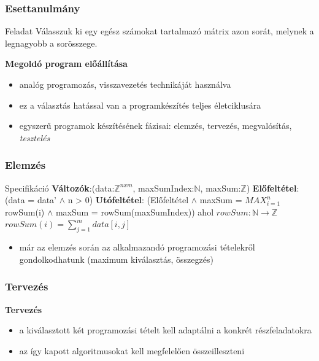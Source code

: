 \documentclass[11pt]{beamer}
\begin{document}
\begin{frame}
	\frametitle{Esettanulmány}
	\begin{block}{Feladat}
		Válasszuk ki egy egész számokat tartalmazó mátrix azon sorát, melynek a legnagyobb a sorösszege.
	\end{block}
	\vspace*{6px}
	\textbf{Megoldó program előállítása}
	\begin{itemize}
		\item analóg programozás, visszavezetés technikáját használva
		\item ez a választás hatással van a programkészítés teljes életciklusára
		\item egyszerű programok készítésének fázisai: elemzés, tervezés, megvalósítás, \textit{tesztelés}
	\end{itemize}
	\vspace*{10px}
\end{frame}

\begin{frame}
	\frametitle{Elemzés}
	\begin{block}{Specifikáció}
		\textbf{Változók}:\hspace{13px}(data:$\mathbb{Z}^{nxm}$, maxSumIndex:$\mathbb{N}$, maxSum:$\mathbb{Z}$)
		\smallskip\linebreak
		\textbf{Előfeltétel}:\hspace{7px}(data = data' $\wedge$ n > 0)
		\smallskip\linebreak
		\textbf{Utófeltétel}: (Előfeltétel $\wedge$ maxSum = $MAX_{i=1}^n$ rowSum(i) $\wedge$
		\linebreak
		\hspace*{122px} maxSum = rowSum(maxSumIndex))
		\bigskip\linebreak
		ahol $rowSum: \mathbb{N} \rightarrow \mathbb{Z}$\linebreak	
		\hspace*{19px} $rowSum(i) = \sum_{j=1}^m data[i,j]$
	\end{block}
	
	\begin{itemize}
		\item már az elemzés során az alkalmazandó programozási tételekről gondolkodhatunk (maximum kiválasztás, összegzés)
	\end{itemize}
	\vspace*{20px}
\end{frame}

\begin{frame}
	\frametitle{Tervezés}
	\textbf{Tervezés}
	\begin{itemize}
		\item a kiválasztott két programozási tételt kell adaptálni a konkrét részfeladatokra
		\item az így kapott algoritmusokat kell megfelelően összeilleszteni
	\end{itemize}
\end{frame}
\end{document}
